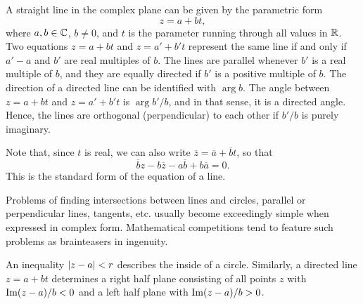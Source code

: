 A straight line in the complex plane can be given by the parametric form $$z=a+bt,$$ where $a,b \in \mathbb C$, $b \neq 0$, and $t$ is the parameter running through all values in $\mathbb R$. Two equations $z=a+bt$ and $z=a'+b't$ represent the same line if and only if $a'-a$ and $b'$ are real multiples of $b$. The lines are parallel whenever $b'$ is a real multiple of $b$, and they are equally directed if $b'$ is a positive multiple of $b$. The direction of a directed line can be identified with $\arg b$. The angle between $z=a+bt$ and $z=a'+b't$ is $\arg b'/b$, and in that sense, it is a directed angle. Hence, the lines are orthogonal (perpendicular) to each other if $b'/b$ is purely imaginary.

Note that, since $t$ is real, we can also write $\overline{z}=\overline{a}+\overline{b}t$, so that $$\overline{b}z-b\overline{z}-a\overline{b}+b\overline{a}=0.$$ This is the standard form of the equation of a line.

Problems of finding intersections between lines and circles, parallel or perpendicular lines, tangents, etc. usually become exceedingly simple when expressed in complex form. Mathematical competitions tend to feature such problems as brainteasers in ingenuity.

An inequality $\lvert z-a \rvert<r$ describes the inside of a circle. Similarly, a directed line $z=a+bt$ determines a right half plane consisting of all points $z$ with $\operatorname{Im}(z-a)/b<0$ and a left half plane with $\operatorname{Im}(z-a)/b>0$.

